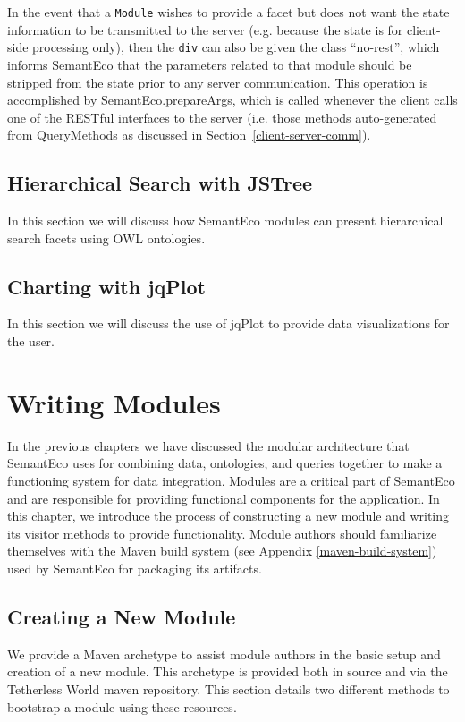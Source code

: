 \documentclass[letterpaper]{report}
\begin{document}
In the event that a \texttt{Module} wishes to provide a facet but does not want the state information to be transmitted to the server (e.g. because the state is for client-side processing only), then the \texttt{div} can also be given the class ``no-rest'', which informs SemantEco that the parameters related to that module should be stripped from the state prior to any server communication. This operation is accomplished by SemantEco.prepareArgs, which is called whenever the client calls one of the RESTful interfaces to the server (i.e. those methods auto-generated from QueryMethods as discussed in Section~\ref{client-server-comm}).

\section{Hierarchical Search with JSTree}
\label{hierarchical-search}
In this section we will discuss how SemantEco modules can present hierarchical search facets using OWL ontologies.
\section{Charting with jqPlot}
\label{visualization}
In this section we will discuss the use of jqPlot to provide data visualizations for the user.




\chapter{Writing Modules}
\label{writing-modules}
In the previous chapters we have discussed the modular architecture that SemantEco uses for combining data, ontologies, and queries together to make a functioning system for data integration. Modules are a critical part of SemantEco and are responsible for providing functional components for the application. In this chapter, we introduce the process of constructing a new module and writing its visitor methods to provide functionality. Module authors should familiarize themselves with the Maven build system (see Appendix \ref{maven-build-system}) used by SemantEco for packaging its artifacts.

\section{Creating a New Module}
We provide a Maven archetype to assist module authors in the basic setup and creation of a new module. This archetype is provided both in source and via the Tetherless World maven repository. This section details two different methods to bootstrap a module using these resources.
\end{document}
